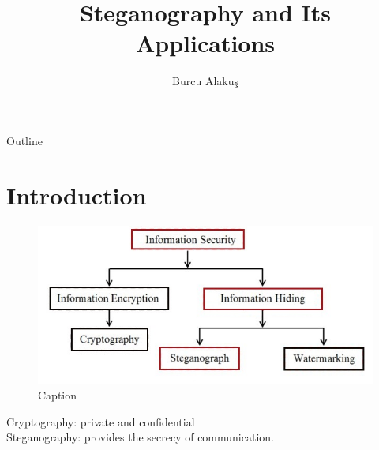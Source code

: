 \documentclass[12pt,hyperref={unicode}]{beamer}
\author{Burcu Alakuş}
\title{Steganography and Its Applications}
\institute{Atılım University}
\begin{document}
\begin{frame}
\titlepage
\end{frame}

\begin{frame}{Outline}
\centering
\tableofcontents
\centering
\end{frame}

\section{Introduction}
\begin{frame}
\begin{figure}
    \centering
    \includegraphics{Fig-7-Classification-of-the-security-system-41-Watermarking-Techniques-Digital_W640.jpg}
    \caption{Caption}
    \label{fig:my_label}
\end{figure}
\begin{center}
Cryptography: private and confidential\\ Steganography: provides the secrecy of communication.
\end{center}
\end{frame}




\end{document}
